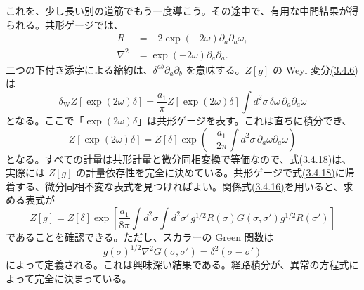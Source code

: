 これを、少し長い別の道筋でもう一度導こう。その途中で、有用な中間結果が得られる。共形ゲージでは、
\begin{align}
R&=-2\exp(-2\omega)\partial_a\partial_a\omega,
\tag{3.4.16a}\label{eq:3.4.16a}\\
\nabla^2&=\exp(-2\omega)\partial_a\partial_a.
\tag{3.4.16b}\label{eq:3.4.16b}
\end{align}
二つの下付き添字による縮約は、$\delta^{ab}\partial_a\partial_b$ を意味する。$Z[g]$ の Weyl 変分\hyperref[eq:3.4.6]{(3.4.6)}は
\begin{equation}
\delta_{\mathrm W}Z[\exp(2\omega)\delta]
=\frac{a_1}{\pi}Z[\exp(2\omega)\delta]
\int d^2\sigma\,\delta\omega\,\partial_a\partial_a\omega
\tag{3.4.17}\label{eq:3.4.17}
\end{equation}
となる。ここで「$\exp(2\omega)\delta$」は共形ゲージを表す。これは直ちに積分でき、
\begin{equation}
Z[\exp(2\omega)\delta]
=Z[\delta]\exp\left(-\frac{a_1}{2\pi}
\int d^2\sigma\,\partial_a\omega\partial_a\omega\right)
\tag{3.4.18}\label{eq:3.4.18}
\end{equation}
となる。すべての計量は共形計量と微分同相変換で等価なので、式\hyperref[eq:3.4.18]{(3.4.18)}は、実際には $Z[g]$ の計量依存性を完全に決めている。共形ゲージで式\hyperref[eq:3.4.18]{(3.4.18)}に帰着する、微分同相不変な表式を見つければよい。関係式\hyperref[eq:3.4.16a]{(3.4.16)}を用いると、求める表式が
\begin{equation}
Z[g]=Z[\delta]\exp\left[
\frac{a_1}{8\pi}\int d^2\sigma\int d^2\sigma'\,
g^{1/2}R(\sigma)G(\sigma,\sigma')g^{1/2}R(\sigma')
\right]
\tag{3.4.19}\label{eq:3.4.19}
\end{equation}
であることを確認できる。ただし、スカラーの Green 関数は
\begin{equation}
g(\sigma)^{1/2}\nabla^2G(\sigma,\sigma')
=\delta^2(\sigma-\sigma')
\tag{3.4.20}\label{eq:3.4.20}
\end{equation}
によって定義される。これは興味深い結果である。経路積分が、異常の方程式によって完全に決まっている。

